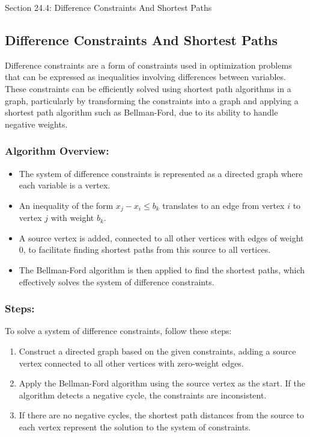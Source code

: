 \begin{notes}{Section 24.4: Difference Constraints And Shortest Paths}
    \subsection*{Difference Constraints And Shortest Paths}

    Difference constraints are a form of constraints used in optimization problems that can be expressed as inequalities involving differences between variables. These constraints can be efficiently 
    solved using shortest path algorithms in a graph, particularly by transforming the constraints into a graph and applying a shortest path algorithm such as Bellman-Ford, due to its ability to 
    handle negative weights. \vspace*{1em}
    
    \subsubsection*{Algorithm Overview:}
    
    \begin{itemize}
        \item The system of difference constraints is represented as a directed graph where each variable is a vertex.
        \item An inequality of the form $x_j - x_i \leq b_k$ translates to an edge from vertex $i$ to vertex $j$ with weight $b_k$.
        \item A source vertex is added, connected to all other vertices with edges of weight 0, to facilitate finding shortest paths from this source to all vertices.
        \item The Bellman-Ford algorithm is then applied to find the shortest paths, which effectively solves the system of difference constraints.
    \end{itemize}
    
    \subsubsection*{Steps:}
    
    To solve a system of difference constraints, follow these steps:
    \begin{enumerate}
        \item Construct a directed graph based on the given constraints, adding a source vertex connected to all other vertices with zero-weight edges.
        \item Apply the Bellman-Ford algorithm using the source vertex as the start. If the algorithm detects a negative cycle, the constraints are inconsistent.
        \item If there are no negative cycles, the shortest path distances from the source to each vertex represent the solution to the system of constraints.
    \end{enumerate}
    

\end{notes}
